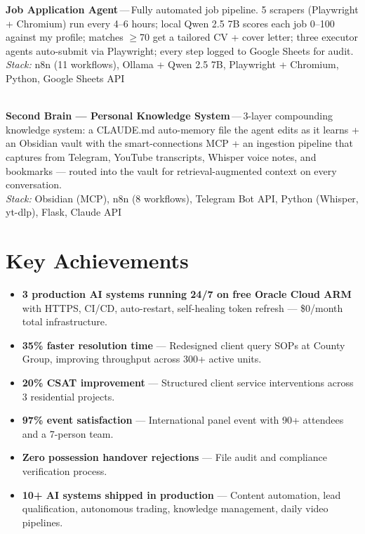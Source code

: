 \documentclass[a4paper,11pt]{article}
\newcommand{\project}[3]{%
  \textbf{#1}\,{\color{muted}---}\,#2\\[1pt]%
  {\small\color{muted}\textit{Stack:} #3}\vspace{8pt}%
}
\begin{document}
\project{Job Application Agent}{Fully automated job pipeline. 5 scrapers (Playwright + Chromium) run every 4--6 hours; local Qwen 2.5 7B scores each job 0--100 against my profile; matches \(\geq\)70 get a tailored CV + cover letter; three executor agents auto-submit via Playwright; every step logged to Google Sheets for audit.}{n8n (11 workflows), Ollama + Qwen 2.5 7B, Playwright + Chromium, Python, Google Sheets API}
\vspace{8pt}\\

\project{Second Brain --- Personal Knowledge System}{3-layer compounding knowledge system: a CLAUDE.md auto-memory file the agent edits as it learns + an Obsidian vault with the smart-connections MCP + an ingestion pipeline that captures from Telegram, YouTube transcripts, Whisper voice notes, and bookmarks --- routed into the vault for retrieval-augmented context on every conversation.}{Obsidian (MCP), n8n (8 workflows), Telegram Bot API, Python (Whisper, yt-dlp), Flask, Claude API}

\section*{Key Achievements}
\begin{itemize}
  \item \textbf{3 production AI systems running 24/7 on free Oracle Cloud ARM} with HTTPS, CI/CD, auto-restart, self-healing token refresh --- \$0/month total infrastructure.
  \item \textbf{35\% faster resolution time} --- Redesigned client query SOPs at County Group, improving throughput across 300+ active units.
  \item \textbf{20\% CSAT improvement} --- Structured client service interventions across 3 residential projects.
  \item \textbf{97\% event satisfaction} --- International panel event with 90+ attendees and a 7-person team.
  \item \textbf{Zero possession handover rejections} --- File audit and compliance verification process.
  \item \textbf{10+ AI systems shipped in production} --- Content automation, lead qualification, autonomous trading, knowledge management, daily video pipelines.
\end{itemize}
\end{document}
